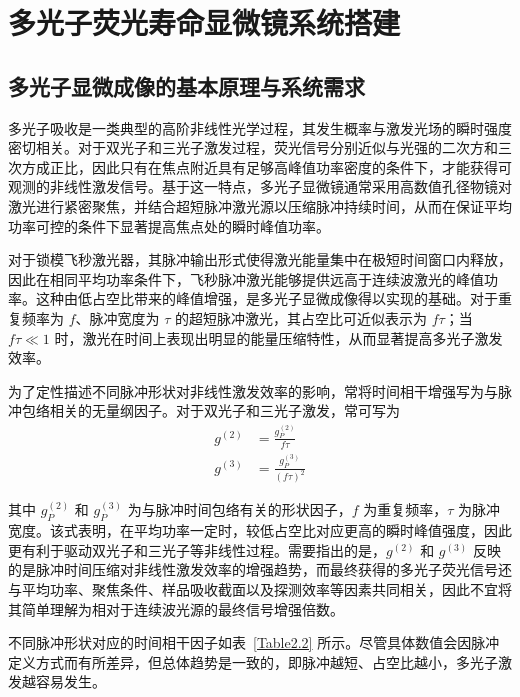 \chapter{多光子荧光寿命显微镜系统搭建}\label{Chap:4}

\section{多光子显微成像的基本原理与系统需求}\label{4.1}

多光子吸收是一类典型的高阶非线性光学过程，其发生概率与激发光场的瞬时强度密切相关。对于双光子和三光子激发过程，荧光信号分别近似与光强的二次方和三次方成正比，因此只有在焦点附近具有足够高峰值功率密度的条件下，才能获得可观测的非线性激发信号。基于这一特点，多光子显微镜通常采用高数值孔径物镜对激光进行紧密聚焦，并结合超短脉冲激光源以压缩脉冲持续时间，从而在保证平均功率可控的条件下显著提高焦点处的瞬时峰值功率。

对于锁模飞秒激光器，其脉冲输出形式使得激光能量集中在极短时间窗口内释放，因此在相同平均功率条件下，飞秒脉冲激光能够提供远高于连续波激光的峰值功率。这种由低占空比带来的峰值增强，是多光子显微成像得以实现的基础。对于重复频率为 $f$、脉冲宽度为 $\tau$ 的超短脉冲激光，其占空比可近似表示为 $f\tau$；当 $f\tau \ll 1$ 时，激光在时间上表现出明显的能量压缩特性，从而显著提高多光子激发效率。

为了定性描述不同脉冲形状对非线性激发效率的影响，常将时间相干增强写为与脉冲包络相关的无量纲因子。对于双光子和三光子激发，常可写为
\begin{align}
  g^{(2)} &= \frac{g_P^{(2)}}{f\tau}\\
  g^{(3)} &= \frac{g_P^{(3)}}{(f\tau)^2}
\end{align}

其中 $g_P^{(2)}$ 和 $g_P^{(3)}$ 为与脉冲时间包络有关的形状因子，$f$ 为重复频率，$\tau$ 为脉冲宽度。该式表明，在平均功率一定时，较低占空比对应更高的瞬时峰值强度，因此更有利于驱动双光子和三光子等非线性过程。需要指出的是，$g^{(2)}$ 和 $g^{(3)}$ 反映的是脉冲时间压缩对非线性激发效率的增强趋势，而最终获得的多光子荧光信号还与平均功率、聚焦条件、样品吸收截面以及探测效率等因素共同相关，因此不宜将其简单理解为相对于连续波光源的最终信号增强倍数。

不同脉冲形状对应的时间相干因子如表~\ref{Table2.2} 所示。尽管具体数值会因脉冲定义方式而有所差异，但总体趋势是一致的，即脉冲越短、占空比越小，多光子激发越容易发生。

